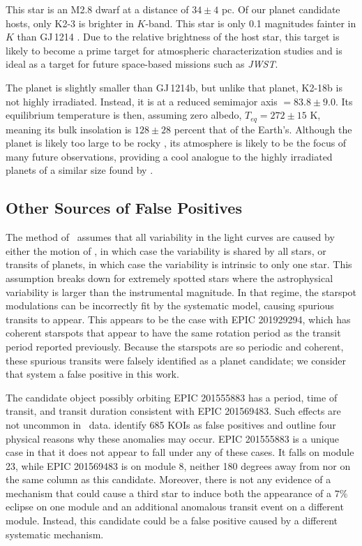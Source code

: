 This star is an M2.8 dwarf at a distance of $34\pm4$ pc.
Of our planet candidate hosts, only K2-3 \citep[originally
discovered by][]{Crossfield15} is brighter in $K$-band.
This star is only 0.1 magnitudes fainter in $K$ than GJ\,1214
\citep{Charbonneau09}.
Due to the relative brightness of the host star, this target is likely
to become a prime target for atmospheric characterization studies
and is ideal as a target for future space-based missions such as
\textit{JWST}.

The planet is slightly smaller than GJ\,1214b, but unlike that planet,
K2-18b is not highly irradiated.
Instead, it is at a reduced semimajor axis \ars$ = 83.8 \pm 9.0$.
Its equilibrium temperature is then, assuming zero albedo, $T_{eq} = 272 \pm 15$
K, meaning its bulk insolation is $128 \pm 28$ percent that of the Earth's.
Although the planet is likely too large to be rocky \citep{Rogers14},
its atmosphere is likely to be the focus of many future observations, providing
a cool analogue to the highly irradiated planets of a similar size found by
\kep.


\subsection{Other Sources of False Positives}
\label{sec:systematics}

The method of \paperit\ assumes that all variability in the light curves are
caused by either the motion of \KT, in which case the variability is shared
by all stars, or transits of planets, in which case the variability is intrinsic
to only one star.
This assumption breaks down for extremely spotted stars where the
astrophysical variability is larger than the instrumental
magnitude.
In that regime, the starspot modulations can be incorrectly fit by the
systematic model, causing spurious transits to appear.
This appears to be the case with EPIC 201929294, which has
coherent starspots that appear to have the same rotation period as the
transit period reported previously.
Because the starspots are so periodic and coherent, these spurious
transits were falsely identified as a planet candidate; we consider that
system a false positive in this work.

The candidate object possibly orbiting EPIC 201555883 has a period,
time of transit, and transit duration consistent with EPIC 201569483.
Such effects are not uncommon in \kep\ data.
\citet{Coughlin14} identify 685 KOIs as false
positives and outline four physical reasons why these anomalies may occur.
EPIC 201555883 is a unique case in that it does not appear to fall under any
of these cases. It falls on module 23, while EPIC 201569483 is on module 8,
neither 180 degrees away from nor on the same column as this candidate.
Moreover, there is not any evidence of a mechanism that could cause a third
star to induce both the appearance of a $7\%$ eclipse on one module and an
additional anomalous transit event on a different module.
Instead, this candidate could be a false positive caused by a different
systematic mechanism.

